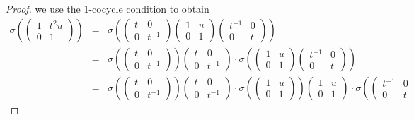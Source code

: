 \begin{proof}
we use the 1-cocycle condition to obtain
\begin{eqnarray*}
\sigma\left(
\left(\begin{matrix}
1 & t^2u \\ 0 & 1
\end{matrix}\right)
\right)
&=&\sigma\left(
\left(\begin{matrix}
t & 0 \\ 0 & t^{-1}
\end{matrix}\right)
\left(\begin{matrix}
1 & u \\ 0 & 1
\end{matrix}\right)
\left(\begin{matrix}
t^{-1} & 0 \\ 0 & t
\end{matrix}\right)
\right)\\
&=&
\sigma\left(
\left(\begin{matrix}
t & 0 \\ 0 & t^{-1}
\end{matrix}\right)
\right)
\left(\begin{matrix}
t & 0 \\ 0 & t^{-1}
\end{matrix}\right) \cdot
\sigma\left(
\left(\begin{matrix}
1 & u \\ 0 & 1
\end{matrix}\right)
\left(\begin{matrix}
t^{-1} & 0 \\ 0 & t
\end{matrix}\right)
\right)\\
&=&
\sigma\left(
\left(\begin{matrix}
t & 0 \\ 0 & t^{-1}
\end{matrix}\right)
\right)
\left(\begin{matrix}
t & 0 \\ 0 & t^{-1}
\end{matrix}\right) \cdot
\sigma\left(
\left(\begin{matrix}
1 & u \\ 0 & 1
\end{matrix}\right)
\right)
\left(\begin{matrix}
1 & u \\ 0 & 1
\end{matrix}\right) \cdot
\sigma\left(
\left(\begin{matrix}
t^{-1} & 0 \\ 0 & t

\end{matrix}
\end{eqnarray*}
\end{proof}
